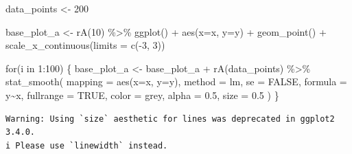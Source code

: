 \documentclass[
  letterpaper,
  DIV=11,
  numbers=noendperiod]{scrreprt}
\newenvironment{Shaded}{\begin{snugshade}}{\end{snugshade}}
\newcommand{\AttributeTok}[1]{\textcolor[rgb]{0.40,0.45,0.13}{#1}}
\newcommand{\ConstantTok}[1]{\textcolor[rgb]{0.56,0.35,0.01}{#1}}
\newcommand{\ControlFlowTok}[1]{\textcolor[rgb]{0.00,0.23,0.31}{#1}}
\newcommand{\DecValTok}[1]{\textcolor[rgb]{0.68,0.00,0.00}{#1}}
\newcommand{\FloatTok}[1]{\textcolor[rgb]{0.68,0.00,0.00}{#1}}
\newcommand{\FunctionTok}[1]{\textcolor[rgb]{0.28,0.35,0.67}{#1}}
\newcommand{\NormalTok}[1]{\textcolor[rgb]{0.00,0.23,0.31}{#1}}
\newcommand{\OtherTok}[1]{\textcolor[rgb]{0.00,0.23,0.31}{#1}}
\newcommand{\SpecialCharTok}[1]{\textcolor[rgb]{0.37,0.37,0.37}{#1}}
\newcommand{\StringTok}[1]{\textcolor[rgb]{0.13,0.47,0.30}{#1}}
\begin{document}
\begin{Shaded}
\begin{Highlighting}[]
\NormalTok{data\_points }\OtherTok{\textless{}{-}} \DecValTok{200}

\NormalTok{base\_plot\_a }\OtherTok{\textless{}{-}} \FunctionTok{rA}\NormalTok{(}\DecValTok{10}\NormalTok{) }\SpecialCharTok{\%\textgreater{}\%}  
  \FunctionTok{ggplot}\NormalTok{() }\SpecialCharTok{+} 
  \FunctionTok{aes}\NormalTok{(}\AttributeTok{x=}\NormalTok{x, }\AttributeTok{y=}\NormalTok{y) }\SpecialCharTok{+} 
  \FunctionTok{geom\_point}\NormalTok{() }\SpecialCharTok{+} 
  \FunctionTok{scale\_x\_continuous}\NormalTok{(}\AttributeTok{limits =} \FunctionTok{c}\NormalTok{(}\SpecialCharTok{{-}}\DecValTok{3}\NormalTok{, }\DecValTok{3}\NormalTok{))}

\ControlFlowTok{for}\NormalTok{(i }\ControlFlowTok{in} \DecValTok{1}\SpecialCharTok{:}\DecValTok{100}\NormalTok{) \{ }
\NormalTok{    base\_plot\_a }\OtherTok{\textless{}{-}}\NormalTok{ base\_plot\_a }\SpecialCharTok{+} \FunctionTok{rA}\NormalTok{(data\_points) }\SpecialCharTok{\%\textgreater{}\%} 
      \FunctionTok{stat\_smooth}\NormalTok{(}
        \AttributeTok{mapping =} \FunctionTok{aes}\NormalTok{(}\AttributeTok{x=}\NormalTok{x, }\AttributeTok{y=}\NormalTok{y), }
        \AttributeTok{method  =} \StringTok{\textquotesingle{}lm\textquotesingle{}}\NormalTok{,         }\AttributeTok{se =} \ConstantTok{FALSE}\NormalTok{, }
        \AttributeTok{formula =} \StringTok{\textquotesingle{}y\textasciitilde{}x\textquotesingle{}}\NormalTok{, }\AttributeTok{fullrange =} \ConstantTok{TRUE}\NormalTok{,}
        \AttributeTok{color   =} \StringTok{\textquotesingle{}grey\textquotesingle{}}\NormalTok{,    }\AttributeTok{alpha =} \FloatTok{0.5}\NormalTok{,}
        \AttributeTok{size    =} \FloatTok{0.5}
\NormalTok{      )}
\NormalTok{\}}
\end{Highlighting}
\end{Shaded}

\begin{verbatim}
Warning: Using `size` aesthetic for lines was deprecated in ggplot2 3.4.0.
i Please use `linewidth` instead.
\end{verbatim}
\end{document}
